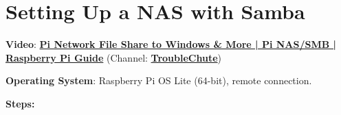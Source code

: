 \section{Setting Up a NAS with Samba}

\noindent \textbf{Video}: \href{https://www.youtube.com/watch?v=8QxJWW0mjAs}{\textbf{\color{blue}Pi Network File Share to Windows \& More | Pi NAS/SMB | Raspberry Pi Guide}} (Channel: \href{https://www.youtube.com/@TroubleChute}{\textbf{\color{blue}TroubleChute}})

\vspace{0.5cm}

\noindent \textbf{Operating System}: Raspberry Pi OS Lite (64-bit), remote connection.

\vspace{0.5cm}

\noindent \textbf{Steps:}

